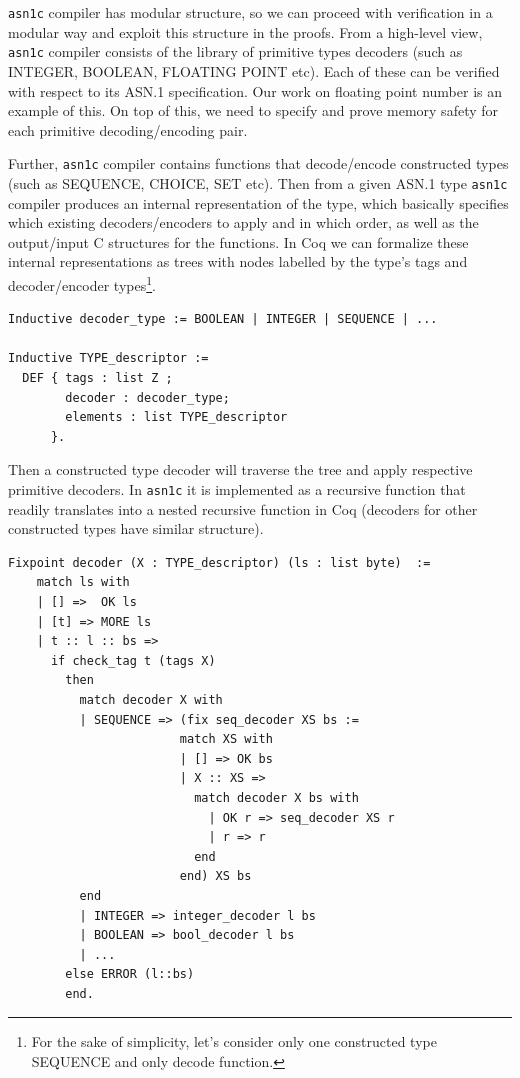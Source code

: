 \documentclass[acmsmall,nonacm]{acmart}
\begin{document}
 \texttt{asn1c} compiler has modular structure, so we can proceed with verification in a modular way and exploit this structure in the proofs. From a high-level view, \texttt{asn1c} compiler consists of the library of primitive types decoders (such as INTEGER, BOOLEAN, FLOATING POINT etc). Each of these can be verified with respect to its ASN.1 specification. Our work on floating point number is an example of this. On top of this, we need to specify and prove memory safety for each primitive decoding/encoding pair.

 Further, \texttt{asn1c} compiler contains functions that decode/encode constructed types (such as SEQUENCE, CHOICE, SET etc). Then from a given ASN.1 type \texttt{asn1c} compiler produces an internal representation of the type, which basically specifies which existing decoders/encoders to apply and in which order, as well as the output/input C structures for the functions. In Coq we can formalize these internal representations as trees with nodes labelled by the type's tags and decoder/encoder types\footnote{For the sake of simplicity, let's consider only one constructed type SEQUENCE and only decode function.}.

 \begin{lstlisting}[language=Coq]
Inductive decoder_type := BOOLEAN | INTEGER | SEQUENCE | ...

Inductive TYPE_descriptor :=
  DEF { tags : list Z ;
        decoder : decoder_type;
        elements : list TYPE_descriptor 
      }.
 \end{lstlisting}

Then a constructed type decoder will traverse the tree and apply respective primitive decoders. In \texttt{asn1c} it is implemented as a recursive function that readily translates into a nested recursive function in Coq (decoders for other constructed types have similar structure).
 
 \begin{lstlisting}[language=Coq]
 Fixpoint decoder (X : TYPE_descriptor) (ls : list byte)  :=
    match ls with
    | [] =>  OK ls
    | [t] => MORE ls       
    | t :: l :: bs =>          
      if check_tag t (tags X)
        then
          match decoder X with 
          | SEQUENCE => (fix seq_decoder XS bs :=
                        match XS with
                        | [] => OK bs
                        | X :: XS =>
                          match decoder X bs with
                            | OK r => seq_decoder XS r 
                            | r => r
                          end
                        end) XS bs
          end
          | INTEGER => integer_decoder l bs
          | BOOLEAN => bool_decoder l bs
          | ...                                    
        else ERROR (l::bs)
        end.
 \end{lstlisting}
\end{document}

